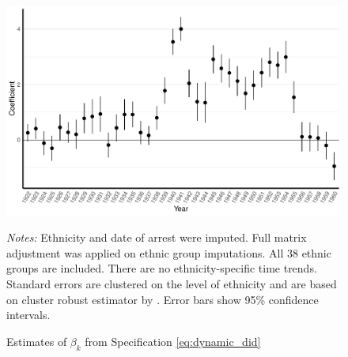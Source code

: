 

 \begin{figure}[h]
\centering
\caption{Estimates of $\beta_k$ from Specification \ref{eq:dynamic_did}}
\includegraphics[width=\textwidth]{plots/final/fmla_pred_full_imp_date_no_trends_geopol_cr2.pdf}
\begin{minipage}{0.92\textwidth}
\footnotesize
\emph{Notes:} Ethnicity and date of arrest were imputed.  Full matrix adjustment was applied on ethnic group imputations. All 38 ethnic groups are included. 
There are no ethnicity-specific time trends. 
Standard errors are clustered on the level of ethnicity and are based on cluster robust estimator by \citet{pustejovsky_small-sample_2018}. Error bars show 95\% confidence intervals. 
\end{minipage}
\label{fig:did_effets}
\end{figure}

